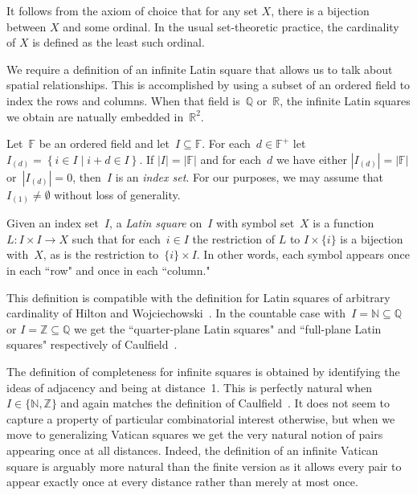 \documentclass[12pt,a4paper]{article}
\newcommand{\Z}{\mathbb{Z}}
\newcommand{\N}{\mathbb{N}}
\newcommand{\R}{\mathbb{R}}
\newcommand{\Q}{\mathbb{Q}}
\newcommand{\F}{\mathbb{F}}
\newcommand{\st}{\; | \;}
\newcommand{\set}[2]{\left\{#1\st #2 \right\}}
\begin{document}
It follows from the axiom of choice that for any set $X$, there is a bijection between $X$ and some ordinal. In the usual set-theoretic practice, the cardinality of $X$ is defined as the least such ordinal. 

We require a definition of an infinite Latin square that allows us to talk about spatial relationships.  This is accomplished by using a subset of an ordered field to index the rows and columns.  When that field is~$\Q$ or~$\R$, the infinite Latin squares we obtain are natually embedded in~$\R^2$.

Let~$\F$ be an ordered field and let~$I \subseteq \F$.   For each~$d \in \F^+$ let~$I_{(d)} = \set{ i \in I }{  i+d \in I }$.  If $|I| = |\F|$ and for each~$d$ we have either $|I_{(d)}| = |\F|$ or~$|I_{(d)}| = 0$, then~$I$ is an {\em index set}.   For our purposes, we may assume that~$I_{(1)} \neq \emptyset$ without loss of generality.

Given an index set~$I$, a {\em Latin square} on~$I$ with symbol set~$X$ is a function $L: I \times I \rightarrow X$ such that for each~$i \in I$ the restriction of $L$ to $I \times \{i\}$ is a bijection with~$X$, as is the restriction to~$\{i\} \times I$.   In other words, each symbol appears once in each ``row" and once in each ``column."  

This definition is  compatible with the definition for Latin squares of arbitrary cardinality of Hilton and Wojciechowski~\cite{HW05}.  In the countable case with~$I = \N \subseteq \Q$ or $I = \Z \subseteq \Q$ we get the ``quarter-plane Latin squares" and ``full-plane Latin squares" respectively of Caulfield~\cite{Caulfield96}.




The definition of completeness for infinite squares is obtained by identifying the ideas of adjacency and being at distance~1.  This is perfectly natural when~$I \in \{ \N ,\Z\}$ and again matches the definition of Caulfield~\cite{Caulfield96}.   It does not seem to capture a property of particular combinatorial interest otherwise, but when we move to generalizing Vatican squares we get the very natural notion of pairs appearing once at all distances.  Indeed, the definition of an infinite Vatican square is arguably more natural than the finite version as it allows every pair to appear exactly once at every distance rather than merely at most once.
\end{document}
